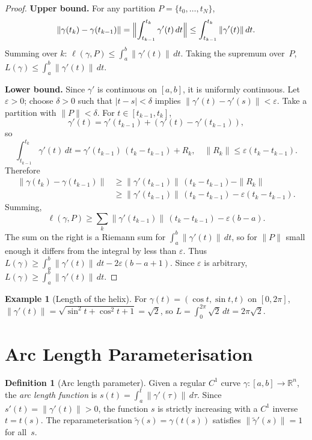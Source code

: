 \documentclass[12pt,a4paper]{book}
\theoremstyle{definition}
\newtheorem{definition}{Definition}[chapter]
\newtheorem{example}{Example}[chapter]
\begin{document}
\begin{proof}
\textbf{Upper bound.}\; For any partition $P=\{t_0,\dots,t_N\}$,
\[
  \|\gamma(t_k)-\gamma(t_{k-1})\|
  = \Bigl\|\int_{t_{k-1}}^{t_k}\gamma'(t)\,dt\Bigr\|
  \le \int_{t_{k-1}}^{t_k}\|\gamma'(t)\|\,dt.
\]
Summing over $k$: $\ell(\gamma,P)\le\int_a^b\|\gamma'(t)\|\,dt$.
Taking the supremum over~$P$,
$L(\gamma)\le\int_a^b\|\gamma'(t)\|\,dt$.

\textbf{Lower bound.}\; Since $\gamma'$ is continuous on $[a,b]$, it is
uniformly continuous.  Let $\varepsilon>0$; choose $\delta>0$ such that
$|t-s|<\delta$ implies $\|\gamma'(t)-\gamma'(s)\|<\varepsilon$.  Take a
partition with $\|P\|<\delta$.  For $t\in[t_{k-1},t_k]$,
\[
  \gamma'(t) = \gamma'(t_{k-1}) + (\gamma'(t)-\gamma'(t_{k-1})),
\]
so
\[
  \int_{t_{k-1}}^{t_k}\gamma'(t)\,dt
  = \gamma'(t_{k-1})\,(t_k-t_{k-1}) + R_k,
  \quad \|R_k\|\le\varepsilon(t_k-t_{k-1}).
\]
Therefore
\begin{align*}
  \|\gamma(t_k)-\gamma(t_{k-1})\|
  &\ge \|\gamma'(t_{k-1})\|\,(t_k-t_{k-1}) - \|R_k\| \\
  &\ge \|\gamma'(t_{k-1})\|\,(t_k-t_{k-1}) - \varepsilon(t_k-t_{k-1}).
\end{align*}
Summing,
\[
  \ell(\gamma,P)
  \ge \sum_k \|\gamma'(t_{k-1})\|\,(t_k-t_{k-1}) - \varepsilon(b-a).
\]
The sum on the right is a Riemann sum for $\int_a^b\|\gamma'(t)\|\,dt$, so
for $\|P\|$ small enough it differs from the integral by less than
$\varepsilon$.  Thus
$L(\gamma)\ge\int_a^b\|\gamma'(t)\|\,dt-2\varepsilon(b-a+1)$.
Since $\varepsilon$ is arbitrary, $L(\gamma)\ge\int_a^b\|\gamma'(t)\|\,dt$.
\end{proof}

\begin{example}[Length of the helix]
\label{ex:helix-length}
For $\gamma(t)=(\cos t,\sin t,t)$ on $[0,2\pi]$,
$\|\gamma'(t)\|=\sqrt{\sin^2 t+\cos^2 t+1}=\sqrt{2}$, so
$L=\int_0^{2\pi}\sqrt{2}\,dt=2\pi\sqrt{2}$.
\end{example}

\section{Arc Length Parameterisation}
\label{sec:arc-length-param}

\begin{definition}[Arc length parameter]\label{def:arc-length-param}
Given a regular $C^1$ curve $\gamma\colon[a,b]\to\mathbb{R}^n$, the
\emph{arc length function} is
$s(t)=\int_a^t\|\gamma'(\tau)\|\,d\tau$.
Since $s'(t)=\|\gamma'(t)\|>0$, the function $s$ is strictly increasing with
a $C^1$ inverse $t=t(s)$.  The reparameterisation
$\tilde\gamma(s)=\gamma(t(s))$ satisfies $\|\tilde\gamma'(s)\|=1$
for all~$s$.
\end{definition}
\end{document}
